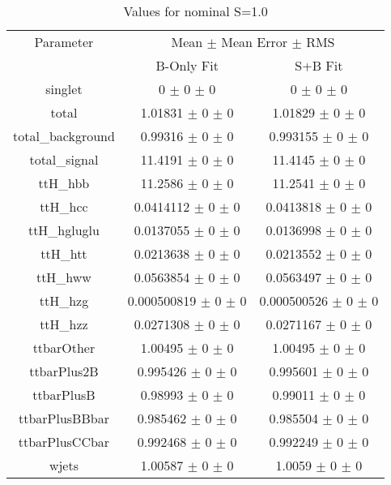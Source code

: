 \begin{table}
\centering
\caption{Values for nominal S=1.0}
\begin{tabular}{ccc}
\toprule
Parameter 	& \multicolumn{2}{c}{Mean $\pm$ Mean Error $\pm$ RMS}\\
 	& B-Only Fit & S+B Fit\\
\midrule
singlet 	& \num{0} $\pm$ \num{0} $\pm$ \num{0} 	& \num{0} $\pm$ \num{0} $\pm$ \num{0}\\
total 	& \num{1.01831} $\pm$ \num{0} $\pm$ \num{0} 	& \num{1.01829} $\pm$ \num{0} $\pm$ \num{0}\\
total\_background 	& \num{0.99316} $\pm$ \num{0} $\pm$ \num{0} 	& \num{0.993155} $\pm$ \num{0} $\pm$ \num{0}\\
total\_signal 	& \num{11.4191} $\pm$ \num{0} $\pm$ \num{0} 	& \num{11.4145} $\pm$ \num{0} $\pm$ \num{0}\\
ttH\_hbb 	& \num{11.2586} $\pm$ \num{0} $\pm$ \num{0} 	& \num{11.2541} $\pm$ \num{0} $\pm$ \num{0}\\
ttH\_hcc 	& \num{0.0414112} $\pm$ \num{0} $\pm$ \num{0} 	& \num{0.0413818} $\pm$ \num{0} $\pm$ \num{0}\\
ttH\_hgluglu 	& \num{0.0137055} $\pm$ \num{0} $\pm$ \num{0} 	& \num{0.0136998} $\pm$ \num{0} $\pm$ \num{0}\\
ttH\_htt 	& \num{0.0213638} $\pm$ \num{0} $\pm$ \num{0} 	& \num{0.0213552} $\pm$ \num{0} $\pm$ \num{0}\\
ttH\_hww 	& \num{0.0563854} $\pm$ \num{0} $\pm$ \num{0} 	& \num{0.0563497} $\pm$ \num{0} $\pm$ \num{0}\\
ttH\_hzg 	& \num{0.000500819} $\pm$ \num{0} $\pm$ \num{0} 	& \num{0.000500526} $\pm$ \num{0} $\pm$ \num{0}\\
ttH\_hzz 	& \num{0.0271308} $\pm$ \num{0} $\pm$ \num{0} 	& \num{0.0271167} $\pm$ \num{0} $\pm$ \num{0}\\
ttbarOther 	& \num{1.00495} $\pm$ \num{0} $\pm$ \num{0} 	& \num{1.00495} $\pm$ \num{0} $\pm$ \num{0}\\
ttbarPlus2B 	& \num{0.995426} $\pm$ \num{0} $\pm$ \num{0} 	& \num{0.995601} $\pm$ \num{0} $\pm$ \num{0}\\
ttbarPlusB 	& \num{0.98993} $\pm$ \num{0} $\pm$ \num{0} 	& \num{0.99011} $\pm$ \num{0} $\pm$ \num{0}\\
ttbarPlusBBbar 	& \num{0.985462} $\pm$ \num{0} $\pm$ \num{0} 	& \num{0.985504} $\pm$ \num{0} $\pm$ \num{0}\\
ttbarPlusCCbar 	& \num{0.992468} $\pm$ \num{0} $\pm$ \num{0} 	& \num{0.992249} $\pm$ \num{0} $\pm$ \num{0}\\
wjets 	& \num{1.00587} $\pm$ \num{0} $\pm$ \num{0} 	& \num{1.0059} $\pm$ \num{0} $\pm$ \num{0}\\
\bottomrule
\end{tabular}
\end{table}